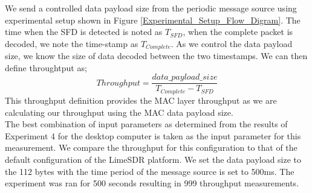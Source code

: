 We send a controlled data payload size from the periodic message source using experimental setup shown in Figure \ref{Experimental_Setup_Flow_Digram}.
The time when the SFD is detected is noted as $T_{SFD}$, when the complete packet is decoded, we note the time-stamp as $T_{Complete}$.
As we control the data payload size, we know the size of data decoded between the two timestamps.
We can then define throughtput as;
\begin{equation} \label{eq:throughput}
    Throughput= \frac{data\_payload\_size}{T_{Complete} - T_{SFD}}
\end{equation}
This throughput definition provides the MAC layer throughput as we are calculating our throughput using the MAC data payload size.\\

The best combination of input parameters as determined from the results of Experiment 4 for the desktop computer is taken as the input parameter for this measurement.
We compare the throughput for this configuration to that of the default configuration of the LimeSDR platform.
We set the data payload size to the 112 bytes with the time period of the message source is set to 500ms. The experiment was ran for 500 seconds resulting in 999 throughput measurements.





